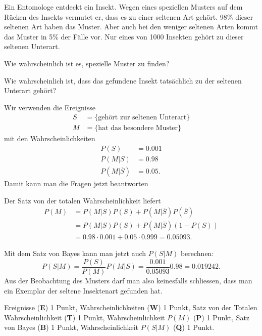 Ein Entomologe entdeckt ein Insekt. Wegen eines speziellen Musters auf
dem Rücken des Insekts vermutet er, dass es zu einer seltenen Art
gehört.
98\% dieser seltenen Art haben das Muster.
Aber auch bei den weniger seltenen Arten kommt das Muster in 5\% der
Fälle vor.
Nur eines von 1000 Insekten gehört zu dieser seltenen Unterart.

\begin{teilaufgaben}
\item
Wie wahrscheinlich ist es, spezielle Muster zu finden?
\item
Wie wahrscheinlich ist, dass das gefundene Insekt tatsächlich zu der
seltenen Unterart gehört?
\end{teilaufgaben}


\begin{loesung}
Wir verwenden die Ereignisse
\begin{align*}
S&=\{\text{gehört zur seltenen Unterart}\}
\\
M&=\{\text{hat das besondere Muster}\}
\end{align*}
mit den Wahrscheinlichkeiten
\begin{align*}
P(S) &= 0.001
\\
P(M|S) &= 0.98
\\
P(M|\overline{S}) &= 0.05.
\end{align*}
Damit kann man die Fragen jetzt beantworten
\begin{teilaufgaben}
\item
Der Satz von der totalen Wahrscheinlichkeit liefert
\begin{align*}
P(M)
&=
P(M|S)P(S) + P(M|\overline{S})P(\overline{S})
\\
&=
P(M|S)P(S) + P(M|\overline{S})(1-P(S))
\\
&=
0.98\cdot 0.001 + 0.05\cdot 0.999
=
0.05093.
\end{align*}
\item
Mit dem Satz von Bayes kann man jetzt auch $P(S|M)$ berechnen:
\[
P(S|M)
=
\frac{P(S)}{P(M)}P(M|S)
=
\frac{0.001}{0.05093}0.98
=
0.019242.
\]
Aus der Beobachtung des Musters darf man also keinesfalls schliessen,
dass man ein Exemplar der seltene Insektenart gefunden hat.
\qedhere
\end{teilaufgaben}
\end{loesung}

\begin{bewertung}
Ereignisse ({\bf E}) 1 Punkt,
Wahrscheinlichkeiten ({\bf W}) 1 Punkt,
Satz von der Totalen Wahrscheinlichkeit ({\bf T}) 1 Punkt,
Wahrscheinlichkeit $P(M)$ ({\bf P}) 1 Punkt,
Satz von Bayes ({\bf B}) 1 Punkt,
Wahrscheinlichkeit $P(S|M)$ ({\bf Q}) 1 Punkt.
\end{bewertung}




